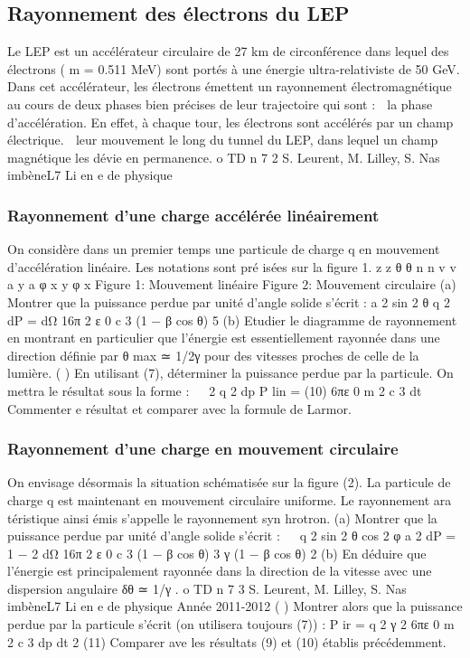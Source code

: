 \subsection{Rayonnement des électrons du LEP}%
Le LEP est un accélérateur circulaire de 27 km de circonférence dans lequel des électrons
( m = 0.511 MeV) sont portés à une énergie ultra-relativiste de 50 GeV.
Dans cet accélérateur, les électrons émettent un rayonnement électromagnétique au cours de
deux phases bien précises de leur trajectoire qui sont :
 la phase d'accélération. En effet, à chaque tour, les électrons sont accélérés par un champ
électrique.
 leur mouvement le long du tunnel du LEP, dans lequel un champ magnétique les dévie en
permanence.
o
TD n 7
2
S. Leurent, M. Lilley, S. Nas imbèneL7
Li en e de physique
\subsubsection{Rayonnement d'une charge accélérée linéairement}%

On considère dans un premier temps une particule de charge q en mouvement d'accélération
linéaire. Les notations sont pré isées sur la figure 1.
z
z
θ
θ
n
n
v
v
a
y
a
φ
x
y
φ
x
Figure 1: Mouvement linéaire
Figure 2: Mouvement
circulaire
(a) Montrer que la puissance perdue par unité d'angle solide s'écrit :
a 2 sin 2 θ
q 2
dP
=
dΩ
16π 2 ε 0 c 3 (1 − β cos θ) 5
(b) Etudier le diagramme de rayonnement en montrant en particulier que l'énergie est essentiellement rayonnée dans une direction définie par θ max ≃ 1/2γ pour des vitesses proches de celle
de la lumière.
( ) En utilisant (7), déterminer la puissance perdue par la particule. On mettra le résultat sous
la forme :
  2
q 2
dp
P lin =
(10)
6πε 0 m 2 c 3 dt
Commenter e résultat et comparer avec la formule de Larmor.
\subsubsection{Rayonnement d'une charge en mouvement circulaire}%
On envisage désormais la situation schématisée sur la figure (2). La particule de charge q
est maintenant en mouvement circulaire uniforme. Le rayonnement ara téristique ainsi émis
s'appelle le rayonnement syn hrotron.
(a) Montrer que la puissance perdue par unité d'angle solide s'écrit :


q 2
sin 2 θ cos 2 φ
a 2
dP
=
1 − 2
dΩ
16π 2 ε 0 c 3 (1 − β cos θ) 3
γ (1 − β cos θ) 2
(b) En déduire que l'énergie est principalement rayonnée dans la direction de la vitesse avec une
dispersion angulaire δθ ≃ 1/γ .
o
TD n 7
3
S. Leurent, M. Lilley, S. Nas imbèneL7
Li en e de physique
Année 2011-2012
( ) Montrer alors que la puissance perdue par la particule s'écrit (on utilisera toujours (7)) :
P ir =
q 2
γ 2
6πε 0 m 2 c 3
dp
dt
2
(11)
Comparer ave les résultats (9) et (10) établis précédemment.
